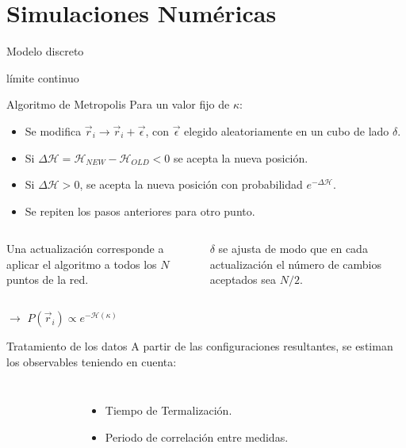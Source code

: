 \documentclass[xcolor=dvipsnames]{beamer}
\begin{document}
\section{Simulaciones Numéricas}
\begin{frame}{Modelo discreto}

\end{frame}
\begin{frame}{límite continuo}
\end{frame}
\begin{frame}{Algoritmo de Metropolis}
Para un valor fijo de $\kappa$:
\begin{itemize}
  \item  Se modifica $\vec{r}_i\rightarrow \vec{r}_i+\vec{\epsilon}$, con
    $\vec{\epsilon}$ elegido aleatoriamente en un cubo de lado $\delta$.
  \item  Si
    $\Delta\mathcal{H}=\mathcal{H}_{NEW}-\mathcal{H}_{OLD}<0$ se
    acepta la nueva posición. 
  \item Si  $\Delta\mathcal{H}>0$, se acepta la nueva posición con
    probabilidad $e^{-\Delta\mathcal{H}}$. 
  \item Se repiten los pasos anteriores para otro punto.
\end{itemize}
\begin{columns}[T]
    \begin{block}{}
      Una actualización corresponde a aplicar el
      algoritmo a todos los $N$ puntos de la red.
    \end{block}
    \begin{block}{}
      $\delta$ se ajusta de modo que en cada actualización el número de cambios
      aceptados sea $N/2$.
    \end{block}
\end{columns}

\begin{description}
\centering
\item[Configuraciones resultantes] $\rightarrow$ $P(\vec{r}_i)\propto e^{-\mathcal{H}(\kappa)}$
\end{description}
\end{frame}
\begin{frame}{Tratamiento de los datos}
A partir de las configuraciones resultantes, se estiman los observables teniendo en cuenta:
\begin{columns}
  \begin{figure}[h]
        \resizebox{\columnwidth}{!}{}
      \end{figure}
  \begin{itemize}
  \item Tiempo de Termalización.
  \item Periodo de correlación entre medidas.
  \end{itemize}
\end{columns}
\end{frame}
\end{document}
